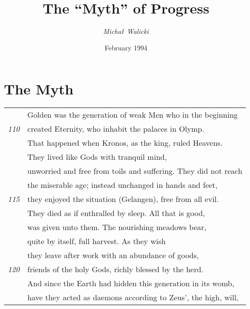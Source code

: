 %

\title{The ``Myth'' of Progress}
\author{{\em Micha{\l}\ Walicki}}
\date{February 1994}
\maketitle

\section{The Myth}
\begin{tabular}[hb]{rl}
& Golden was the generation of weak Men who in the beginning \\
\footnotesize{\em 110}& created Eternity, who inhabit the palaces in Olymp.  \\
& That happened when Kronos, as the king, ruled Heavens. \\
& They lived like Gods with tranquil mind, \\
& unworried and free from toils and suffering. They did not reach \\
& the miserable age; instead unchanged in hands and feet, \\
\footnotesize{\em 115} & they enjoyed the situation (Gelangen), free from all evil. \\
%
& They died as if enthralled by sleep. All that is good, \\
& was given unto them. The nourishing meadows bear, \\
& quite by itself, full harvest. As they wish \\
& they leave after work with an abundance of goods, \\
\footnotesize{\em 120} & friends of the holy Gods, richly blessed by the herd. \\
& And since the Earth had hidden this generation in its womb, \\
& have they acted as daemons according to Zeus', the high, will, \\

\end{tabular}
